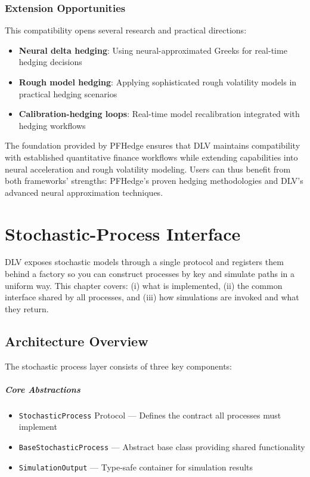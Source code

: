	\subsection{Extension Opportunities}
	
	This compatibility opens several research and practical directions:
	
	\begin{itemize}[nosep]
		\item \textbf{Neural delta hedging}: Using neural-approximated Greeks for real-time hedging decisions
		\item \textbf{Rough model hedging}: Applying sophisticated rough volatility models in practical hedging scenarios
		\item \textbf{Calibration-hedging loops}: Real-time model recalibration integrated with hedging workflows
	\end{itemize}
	
	The foundation provided by PFHedge ensures that DLV maintains compatibility with established quantitative finance workflows while extending capabilities into neural acceleration and rough volatility modeling. Users can thus benefit from both frameworks' strengths: PFHedge's proven hedging methodologies and DLV's advanced neural approximation techniques.
	
	\chapter{Stochastic-Process Interface}\label{ch:stoch_interface}
	
	DLV exposes stochastic models through a single protocol and registers them behind a factory so you can construct processes by key and simulate paths in a uniform way. This chapter covers: (i) what is implemented, (ii) the common interface shared by all processes, and (iii) how simulations are invoked and what they return.
	
	\section{Architecture Overview}
	
	The stochastic process layer consists of three key components:
	
	\paragraph{Core Abstractions}
	\begin{itemize}[nosep]
		\item \texttt{StochasticProcess} Protocol --- Defines the contract all processes must implement
		\item \texttt{BaseStochasticProcess} --- Abstract base class providing shared functionality  
		\item \texttt{SimulationOutput} --- Type-safe container for simulation results
	\end{itemize}
	
